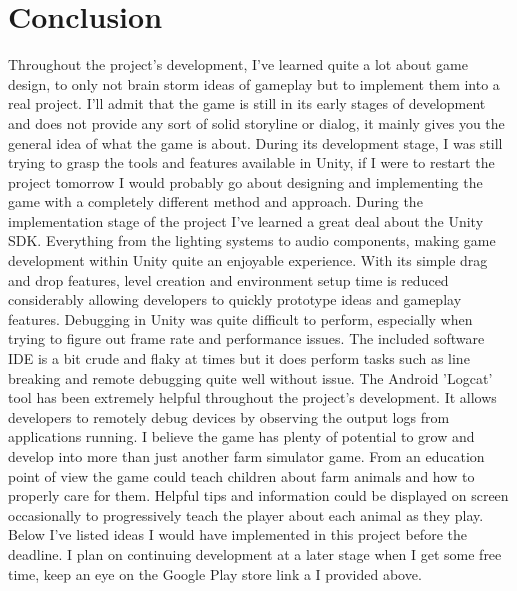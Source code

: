 \chapter{Conclusion}
Throughout the project's development, I've learned quite a lot about game design, to only not brain storm ideas of gameplay but to implement them into a real project. I'll admit that the game is still in its early stages of development and does not provide any sort of solid storyline or dialog, it mainly gives you the general idea of what the game is about. During its development stage, I was still trying to grasp the tools and features available in Unity, if I were to restart the project tomorrow I would probably go about designing and implementing the game with a completely different method and approach.
During the implementation stage of the project I've learned a great deal about the Unity SDK. Everything from the lighting systems to audio components, making game development within Unity quite an enjoyable experience. With its simple drag and drop features, level creation and environment setup time is reduced considerably allowing developers to quickly prototype ideas and gameplay features.
Debugging in Unity was quite difficult to perform, especially when trying to figure out frame rate and performance issues. The included software IDE is a bit crude and flaky at times but it does perform tasks such as line breaking and remote debugging quite well without issue. The Android 'Logcat' tool has been extremely helpful throughout the project's development. It allows developers to remotely debug devices by observing the output logs from applications running.
I believe the game has plenty of potential to grow and develop into more than just another farm simulator game. From an education point of view the game could teach children about farm animals and how to properly care for them. Helpful tips and information could be displayed on screen occasionally to progressively teach the player about each animal as they play. Below I've listed ideas I would have implemented in this project before the deadline. I plan on continuing development at a later stage when I get some free time, keep an eye on the Google Play store link a I provided above.
